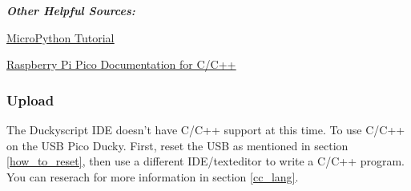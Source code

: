 \documentclass[a4paper,12pt]{article}
\begin{document}
\large
\emph{\textbf{Other Helpful Sources:}}
\normalsize
\begin{description}
	\setlength{\itemindent}{3em}
	\item[$\bullet$] \underline{\href{https://how2electronics.com/raspberry-pi-pico-getting-started-tutorial-with-micropython/}{MicroPython Tutorial}}
	\item[$\bullet$] \underline{\href{https://www.raspberrypi.com/documentation/microcontrollers/c_sdk.html}{Raspberry Pi Pico Documentation for C/C++}}
\end{description}

\subsubsection{Upload}

The Duckyscript IDE doesn't have C/C++ support at this time. To use C/C++ on the USB Pico Ducky. First, reset the USB as mentioned in section \ref{how_to_reset}, then use a different IDE/texteditor to write a C/C++ program. You can reserach for more information in section \ref{cc_lang}.

\newpage
\end{document}
